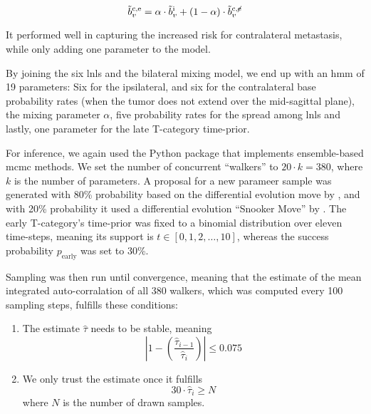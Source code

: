 \documentclass[\relativeRoot/main.tex]{subfiles}
\begin{document}
\begin{equation}
    \tilde{b}_v^\text{c,e} = \alpha \cdot \tilde{b}_v^\text{i} + (1 - \alpha) \cdot \tilde{b}_v^{\text{c},\centernot{\text{e}}}
\end{equation}

It performed well in capturing the increased risk for contralateral metastasis, while only adding one parameter to the model.

By joining the six \glspl{lnl} and the bilateral mixing model, we end up with an \gls{hmm} of 19 parameters: Six for the ipsilateral, and six for the contralateral base probability rates (when the tumor does not extend over the mid-sagittal plane), the mixing parameter $\alpha$, five probability rates for the spread among \glspl{lnl} and lastly, one parameter for the late T-category time-prior.

For inference, we again used the  Python package that implements ensemble-based \gls{mcmc} methods. We set the number of concurrent ``walkers'' to $20 \cdot k = 380$, where $k$ is the number of parameters. A proposal for a new parameer sample was generated with 80\% probability based on the differential evolution move by , and with 20\% probability it used a differential evolution ``Snooker Move'' by . The early T-category's time-prior was fixed to a binomial distribution over eleven time-steps, meaning its support is $t \in \left[0, 1, 2, \ldots, 10\right]$, whereas the success probability $p_\text{early}$ was set to 30\%.

Sampling was then run until convergence, meaning that the estimate of the mean integrated auto-corralation of all 380 walkers, which was computed every 100 sampling steps, fulfills these conditions:

\begin{enumerate}[label={(\arabic*)}]
    \item The estimate $\hat{\tau}$ needs to be stable, meaning
    \begin{equation}
        \left| 1 - \left( \frac{\hat{\tau}_{i-1}}{\hat{\tau}_i} \right) \right| \leq 0.075
    \end{equation}
    \item We only trust the estimate once it fulfills
    \begin{equation}
        30 \cdot \hat{\tau}_i \geq N
    \end{equation}
    where $N$ is the number of drawn samples.
\end{enumerate}
\end{document}
